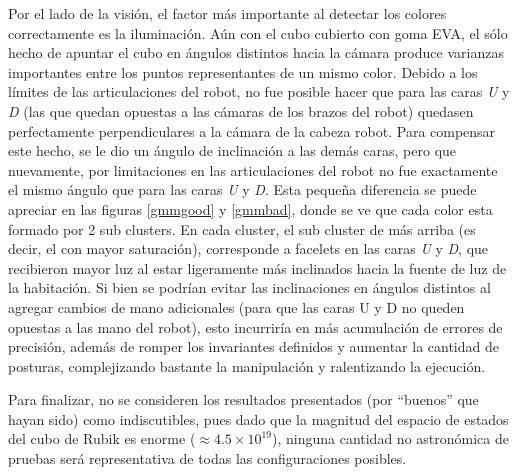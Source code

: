 Por el lado de la visión, el factor más importante al detectar los colores correctamente es la iluminación. Aún con el cubo cubierto con goma EVA, el sólo hecho de apuntar el cubo en ángulos distintos hacia la cámara produce varianzas importantes entre los puntos representantes de un mismo color. Debido a los límites de las articulaciones del robot, no fue posible hacer que para las caras \emph{U} y \emph{D} (las que quedan opuestas a las cámaras de los brazos del robot) quedasen perfectamente perpendiculares a la cámara de la cabeza robot. Para compensar este hecho, se le dio un ángulo de inclinación a las demás caras, pero que nuevamente, por limitaciones en las articulaciones del robot no fue exactamente el mismo ángulo que para las caras \emph{U} y \emph{D}. Esta pequeña diferencia se puede apreciar en las figuras \ref{gmmgood} y \ref{gmmbad}, donde se ve que cada color esta formado por 2 sub clusters. En cada cluster, el sub cluster de más arriba (es decir, el con mayor saturación), corresponde a facelets en las caras \emph{U} y \emph{D}, que recibieron mayor luz al estar ligeramente más inclinados hacia la fuente de luz de la habitación. Si bien se podrían evitar las inclinaciones en ángulos distintos al agregar cambios de mano adicionales (para que las caras U y D no queden opuestas a las mano del robot), esto incurriría en más acumulación de errores de precisión, además de romper los invariantes definidos y aumentar la cantidad de posturas, complejizando bastante la manipulación y ralentizando la ejecución.

Para finalizar, no se consideren los resultados presentados (por ``buenos'' que hayan sido) como indiscutibles, pues dado que la magnitud del espacio de estados del cubo de Rubik es enorme ($\approx 4.5\times 10^{19}$), ninguna cantidad no astronómica de pruebas será representativa de todas las configuraciones posibles.
